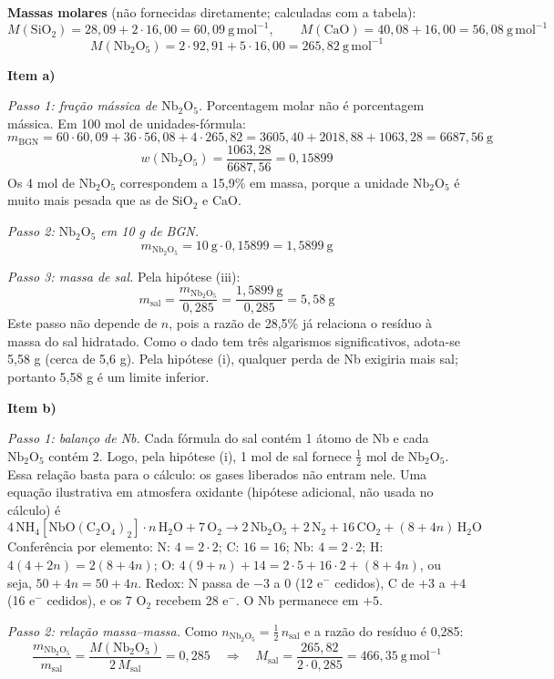 \documentclass{article}%
\begin{document}
\textbf{Massas molares} (não fornecidas diretamente; calculadas com a tabela):
\[
M(\mathrm{SiO_2}) = 28{,}09 + 2\cdot 16{,}00 = 60{,}09\ \mathrm{g\,mol^{-1}},\qquad M(\mathrm{CaO}) = 40{,}08 + 16{,}00 = 56{,}08\ \mathrm{g\,mol^{-1}}
\]
\[
M(\mathrm{Nb_2O_5}) = 2\cdot 92{,}91 + 5\cdot 16{,}00 = 265{,}82\ \mathrm{g\,mol^{-1}}
\]

\textbf{Item a)}

\emph{Passo 1: fração mássica de $\mathrm{Nb_2O_5}$.} Porcentagem molar não é porcentagem mássica. Em 100 mol de unidades-fórmula:
\[
m_{\mathrm{BGN}} = 60\cdot 60{,}09 + 36\cdot 56{,}08 + 4\cdot 265{,}82 = 3605{,}40 + 2018{,}88 + 1063{,}28 = 6687{,}56\ \mathrm{g}
\]
\[
w(\mathrm{Nb_2O_5}) = \frac{1063{,}28}{6687{,}56} = 0{,}15899
\]
Os 4 mol de $\mathrm{Nb_2O_5}$ correspondem a 15,9\% em massa, porque a unidade $\mathrm{Nb_2O_5}$ é muito mais pesada que as de $\mathrm{SiO_2}$ e $\mathrm{CaO}$.

\emph{Passo 2: $\mathrm{Nb_2O_5}$ em 10 g de BGN.}
\[
m_{\mathrm{Nb_2O_5}} = 10\ \mathrm{g}\cdot 0{,}15899 = 1{,}5899\ \mathrm{g}
\]

\emph{Passo 3: massa de sal.} Pela hipótese (iii):
\[
m_{\text{sal}} = \frac{m_{\mathrm{Nb_2O_5}}}{0{,}285} = \frac{1{,}5899\ \mathrm{g}}{0{,}285} = 5{,}58\ \mathrm{g}
\]
Este passo não depende de $n$, pois a razão de 28,5\% já relaciona o resíduo à massa do sal hidratado. Como o dado tem três algarismos significativos, adota-se 5,58 g (cerca de 5,6 g). Pela hipótese (i), qualquer perda de Nb exigiria mais sal; portanto 5,58 g é um limite inferior.

\textbf{Item b)}

\emph{Passo 1: balanço de Nb.} Cada fórmula do sal contém 1 átomo de Nb e cada $\mathrm{Nb_2O_5}$ contém 2. Logo, pela hipótese (i), 1 mol de sal fornece $\tfrac{1}{2}$ mol de $\mathrm{Nb_2O_5}$. Essa relação basta para o cálculo: os gases liberados não entram nele. Uma equação ilustrativa em atmosfera oxidante (hipótese adicional, não usada no cálculo) é
\[
4\,\mathrm{NH_4[NbO(C_2O_4)_2]}\cdot n\,\mathrm{H_2O} + 7\,\mathrm{O_2} \longrightarrow 2\,\mathrm{Nb_2O_5} + 2\,\mathrm{N_2} + 16\,\mathrm{CO_2} + (8+4n)\,\mathrm{H_2O}
\]
Conferência por elemento: N: $4 = 2\cdot 2$; C: $16 = 16$; Nb: $4 = 2\cdot 2$; H: $4(4+2n) = 2(8+4n)$; O: $4(9+n)+14 = 2\cdot 5+16\cdot 2+(8+4n)$, ou seja, $50+4n = 50+4n$. Redox: N passa de $-3$ a $0$ (12 e$^-$ cedidos), C de $+3$ a $+4$ (16 e$^-$ cedidos), e os 7 $\mathrm{O_2}$ recebem 28 e$^-$. O Nb permanece em $+5$.

\emph{Passo 2: relação massa--massa.} Como $n_{\mathrm{Nb_2O_5}} = \tfrac{1}{2}\,n_{\text{sal}}$ e a razão do resíduo é 0,285:
\[
\frac{m_{\mathrm{Nb_2O_5}}}{m_{\text{sal}}} = \frac{M(\mathrm{Nb_2O_5})}{2\,M_{\text{sal}}} = 0{,}285
\quad\Rightarrow\quad
M_{\text{sal}} = \frac{265{,}82}{2\cdot 0{,}285} = 466{,}35\ \mathrm{g\,mol^{-1}}
\]
\end{document}
